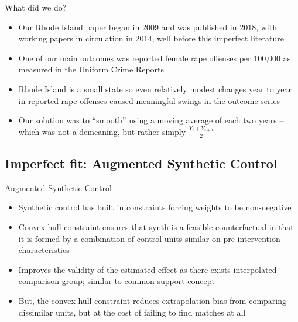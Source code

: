 \documentclass{beamer}
\begin{document}
\begin{frame}{What did we do?}

\begin{itemize}
\item Our Rhode Island paper began in 2009 and was published in 2018, with working papers in circulation in 2014, well before this imperfect literature
\item One of our main outcomes was reported female rape offenses per 100,000 as measured in the Uniform Crime Reports 
\item Rhode Island is a small state so even relatively modest changes year to year in reported rape offenses caused meaningful swings in the outcome series
\item Our solution was to ``smooth'' using a moving average of each two years -- which was not a demeaning, but rather simply $\frac{Y_t + Y_{t+1}}{2}$
\end{itemize}

\end{frame}





\subsection{Imperfect fit: Augmented Synthetic Control}

\begin{frame}{Augmented Synthetic Control}
\begin{itemize}
\item Synthetic control has built in constraints forcing weights to be non-negative
\item Convex hull constraint ensures that synth is a feasible counterfactual in that it is formed by a combination of control units similar on pre-intervention characteristics
\item Improves the validity of the estimated effect as there exists interpolated comparison group; similar to common support concept
\item But, the convex hull constraint reduces extrapolation bias from comparing dissimilar units, but at the cost of failing to find matches at all
\end{itemize}

\end{frame}
\end{document}

